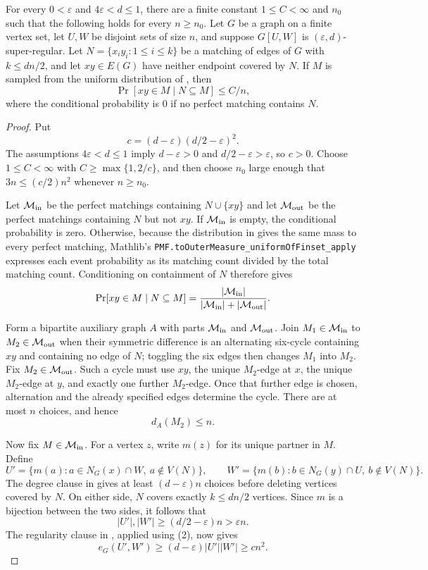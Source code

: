 \begin{lemma}
For every $0<\varepsilon$ and $4\varepsilon<d\leq1$, there are a finite constant $1\leq C<\infty$ and $n_0$ such that the following holds for every $n\geq n_0$. Let $G$ be a graph on a finite vertex set, let $U,W$ be disjoint sets of size $n$, and suppose $G[U,W]$ is $(\varepsilon,d)$-super-regular. Let $N=\{x_i y_i:1\leq i\leq k\}$ be a matching of edges of $G$ with $k\leq dn/2$, and let $xy\in E(G)$ have neither endpoint covered by $N$. If $M$ is sampled from the uniform distribution of , then
\[
 \Pr[xy\in M\mid N\subseteq M]\leq C/n,
\]
where the conditional probability is $0$ if no perfect matching contains $N$.
\end{lemma}
\begin{proof}
Put
\[
 c=(d-\varepsilon)(d/2-\varepsilon)^2.
\]
The assumptions $4\varepsilon<d\leq1$ imply $d-\varepsilon>0$ and
$d/2-\varepsilon>\varepsilon$, so $c>0$.  Choose
$1\leq C<\infty$ with $C\geq\max\{1,2/c\}$, and then choose $n_0$ large enough that
$3n\leq(c/2)n^2$ whenever $n\geq n_0$.

Let $\mathcal M_{\rm in}$ be the perfect matchings containing
$N\cup\{xy\}$ and let $\mathcal M_{\rm out}$ be the perfect matchings
containing $N$ but not $xy$.  If $\mathcal M_{\rm in}$ is empty, the
conditional probability is zero.  Otherwise, because the distribution in
 gives the same mass to every perfect
matching, Mathlib's \texttt{PMF.toOuterMeasure\_uniformOfFinset\_apply}
expresses each event probability as its matching count divided by the total
matching count. Conditioning on containment of $N$ therefore gives
\[
 \Pr[xy\in M\mid N\subseteq M]
 =\frac{|\mathcal M_{\rm in}|}
 {|\mathcal M_{\rm in}|+|\mathcal M_{\rm out}|}.
\]

Form a bipartite auxiliary graph $A$ with parts $\mathcal M_{\rm in}$ and
$\mathcal M_{\rm out}$.  Join $M_1\in\mathcal M_{\rm in}$ to
$M_2\in\mathcal M_{\rm out}$ when their symmetric difference is an
alternating six-cycle containing $xy$ and containing no edge of $N$; toggling
the six edges then changes $M_1$ into $M_2$.  Fix
$M_2\in\mathcal M_{\rm out}$.  Such a cycle must use $xy$, the unique
$M_2$-edge at $x$, the unique $M_2$-edge at $y$, and exactly one further
$M_2$-edge.  Once that further edge is chosen, alternation and the already
specified edges determine the cycle.  There are at most $n$ choices, and
hence
\[
 d_A(M_2)\leq n. \tag{1}
\]

Now fix $M\in\mathcal M_{\rm in}$.  For a vertex $z$, write $m(z)$ for its
unique partner in $M$.  Define
\[
 U'=\{m(a):a\in N_G(x)\cap W,\ a\notin V(N)\},\qquad
 W'=\{m(b):b\in N_G(y)\cap U,\ b\notin V(N)\}.
\]
The degree clause in  gives at least
$(d-\varepsilon)n$ choices before deleting vertices covered by $N$.
On either side, $N$ covers exactly $k\leq dn/2$ vertices.  Since $m$ is a
bijection between the two sides, it follows that
\[
 |U'|,|W'|\geq(d/2-\varepsilon)n>\varepsilon n. \tag{2}
\]
The regularity clause in , applied using (2), now
gives
\[
 e_G(U',W')\geq(d-\varepsilon)|U'||W'|\geq cn^2. \tag{3}
\]


\end{proof}
